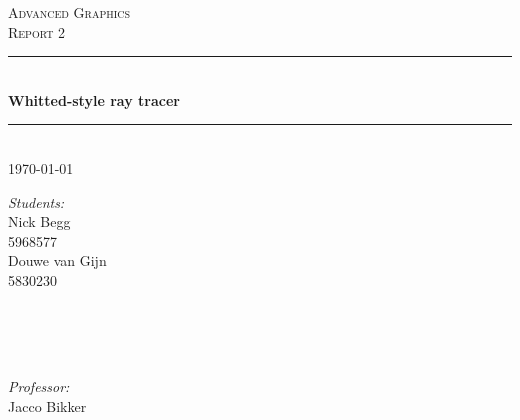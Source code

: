 \documentclass[a4paper,12pt]{article}
\newcommand{\vak}{Advanced Graphics}
\newcommand{\type}{Report 2}
\newcommand{\titel}{Whitted-style ray tracer}
\newcommand{\studentA}{Nick Begg}
\newcommand{\uvanetidA}{5968577}
\newcommand{\studentB}{Douwe van Gijn}
\newcommand{\uvanetidB}{5830230}
\newcommand{\docent}{Jacco Bikker}
\newcommand{\datum}{\today}
\begin{document}
\thispagestyle{firststyle}
\begin{center}
	\textsc{\LARGE \vak}\\[1cm]
	\textsc{\huge \type}\\[0.5cm]
		\rule{\linewidth}{0.5pt} \\[0.5cm]
			{\huge \bfseries \titel}
		\rule{\linewidth}{0.5pt} \\[0.5cm]
	{\large \datum\\[1.5cm]}
	
	\begin{minipage}{0.4\textwidth}
		\begin{flushleft} 
			\emph{Students:}\\[0.1cm]
			{\studentA\\ {\uvanetidA\\[0.2cm]}}
			{\studentB\\ {\uvanetidB\\[0.2cm]}}
			{\studentC\\ {\uvanetidC\\[0.2cm]}}
		\end{flushleft}
	\end{minipage}~%
	\begin{minipage}{0.4\textwidth}
		\begin{flushright} 
			\emph{Professor:} \\[0.1cm]
			\docent\\[0.2cm]
		\end{flushright}
	\end{minipage}\\[1.5 cm]
\end{center}

\newpage

\end{document}
